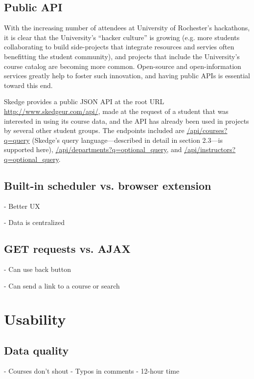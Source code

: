 \subsection{Public API}

With the increasing number of attendees at University of Rochester's hackathons, it is clear that the University's ``hacker culture'' is growing (e.g. more students collaborating to build side-projects that integrate resources and servies often benefitting the student community), and projects that include the University's course catalog are becoming more common. Open-source and open-information services greatly help to foster such innovation, and having public APIs is essential toward this end.

Skedge provides a public JSON API at the root URL \url{http://www.skedgeur.com/api/}, made at the request of a student that was interested in using its course data, and the API has already been used in projects by several other student groups. The endpoints included are \url{/api/courses?q=query} (Skedge's query language---described in detail in section 2.3---is supported here), \url{/api/departments?q=optional_query}, and \url{/api/instructors?q=optional_query}.

\subsection{Built-in scheduler vs. browser extension}

- Better UX

- Data is centralized

\subsection{GET requests vs. AJAX}

- Can use back button

- Can send a link to a course or search


\section{Usability}

\subsection{Data quality}

- Courses don't shout
- Typos in comments
- 12-hour time

